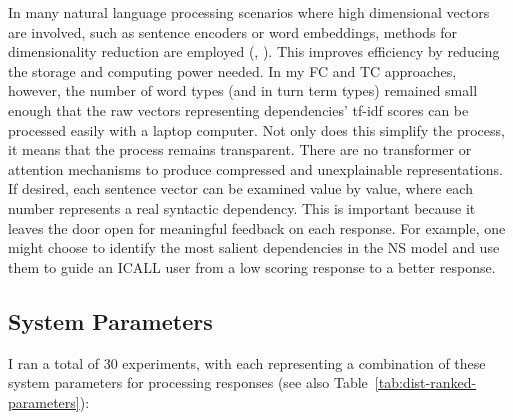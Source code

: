 In many natural language processing scenarios where high dimensional vectors are involved, such as sentence encoders or word embeddings, methods for dimensionality reduction are employed (\citet{BertDevlin2018}, \citet{word2vec}). This improves efficiency by reducing the storage and computing power needed. In my FC and TC approaches, however, the number of word types (and in turn term types) remained small enough that the raw vectors representing dependencies' tf-idf scores can be processed easily with a laptop computer. Not only does this simplify the process, it means that the process remains transparent. There are no transformer or attention mechanisms to produce compressed and unexplainable representations.  If desired, each sentence vector can be examined value by value, where each number represents a real syntactic dependency. This is important because it leaves the door open for meaningful feedback on each response. For example, one might choose to identify the most salient dependencies in the NS model and use them to guide an ICALL user from a low scoring response to a better response.

\subsection{System Parameters}
\label{sec:parameters}

I ran a total of 30 experiments, with each representing a combination of these system parameters for processing responses (see also Table~\ref{tab:dist-ranked-parameters}): 

